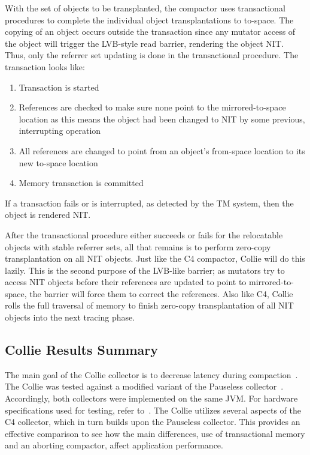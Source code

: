 \documentclass{sig-alternate}
\begin{document}
With the set of objects to be transplanted, the compactor uses transactional
procedures to complete the individual object transplantations to to-space.
The copying of an object occurs outside the transaction since any
mutator access of the object will trigger the LVB-style read barrier,
rendering the object NIT. Thus, only the referrer set updating
is done in the transactional procedure. The transaction looks like:
\begin{enumerate}
\item Transaction is started
\item References are checked to make sure none point to the mirrored-to-space location as this means the object had been changed to NIT by some previous, interrupting operation
\item All references are changed to point from an object's from-space location to its new to-space location
\item Memory transaction is committed
\end{enumerate}
If a transaction fails or is interrupted, as detected by the TM system, then the object is rendered NIT.

After the transactional procedure either succeeds or fails for the 
relocatable objects with stable referrer sets, all that remains is to perform zero-copy transplantation
on all NIT objects. Just like the C4 compactor, Collie will do this lazily. This is the second purpose
of the LVB-like barrier; as mutators try to access NIT objects before their references are updated to
point to mirrored-to-space, the barrier will force them to correct the references. Also like C4, Collie
rolls the full traversal of memory to finish zero-copy transplantation of all NIT objects into the next
tracing phase.


\subsection{Collie Results Summary}
\label{sec:collieResults}


The main goal of the Collie collector is to decrease latency
during compaction~\cite{Iyengar:Collie}. The Collie was tested 
against a modified variant of the Pauseless collector~\cite{Click:Pauseless}.
Accordingly, both collectors were implemented on the same JVM. For hardware
specifications used for testing, refer to~\cite{Iyengar:Collie}. The Collie
utilizes several aspects of the C4 collector, which in turn builds upon the Pauseless
collector. This provides an effective comparison to see how the main differences, 
use of transactional memory and an aborting compactor, affect application performance. 
\end{document}
